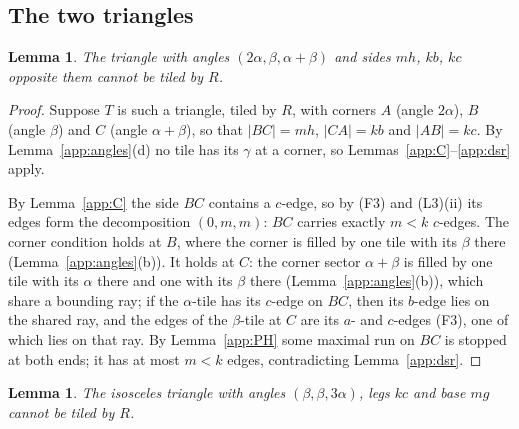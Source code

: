 \documentclass[11pt]{amsart}
\newtheorem{lemma}[theorem]{Lemma}
\theoremstyle{remark}
\begin{document}
\subsection{The two triangles}

\begin{lemma}\label{app:X2}
The triangle with angles $(2\alpha,\beta,\alpha+\beta)$ and sides $mh$, $kb$, $kc$ opposite them cannot be tiled by $R$.
\end{lemma}

\begin{proof}
Suppose $T$ is such a triangle, tiled by $R$, with corners $A$ (angle $2\alpha$), $B$ (angle $\beta$) and $C$ (angle $\alpha+\beta$), so that $|BC|=mh$, $|CA|=kb$ and $|AB|=kc$. By Lemma~\ref{app:angles}(d) no tile has its $\gamma$ at a corner, so Lemmas~\ref{app:C}--\ref{app:dsr} apply.

By Lemma~\ref{app:C} the side $BC$ contains a $c$-edge, so by (F3) and (L3)(ii) its edges form the decomposition $(0,m,m)$: $BC$ carries exactly $m<k$ $c$-edges. The corner condition holds at $B$, where the corner is filled by one tile with its $\beta$ there (Lemma~\ref{app:angles}(b)). It holds at $C$: the corner sector $\alpha+\beta$ is filled by one tile with its $\alpha$ there and one with its $\beta$ there (Lemma~\ref{app:angles}(b)), which share a bounding ray; if the $\alpha$-tile has its $c$-edge on $BC$, then its $b$-edge lies on the shared ray, and the edges of the $\beta$-tile at $C$ are its $a$- and $c$-edges (F3), one of which lies on that ray. By Lemma~\ref{app:PH} some maximal run on $BC$ is stopped at both ends; it has at most $m<k$ edges, contradicting Lemma~\ref{app:dsr}.
\end{proof}

\begin{lemma}\label{app:X1}
The isosceles triangle with angles $(\beta,\beta,3\alpha)$, legs $kc$ and base $mg$ cannot be tiled by $R$.
\end{lemma}
\end{document}
